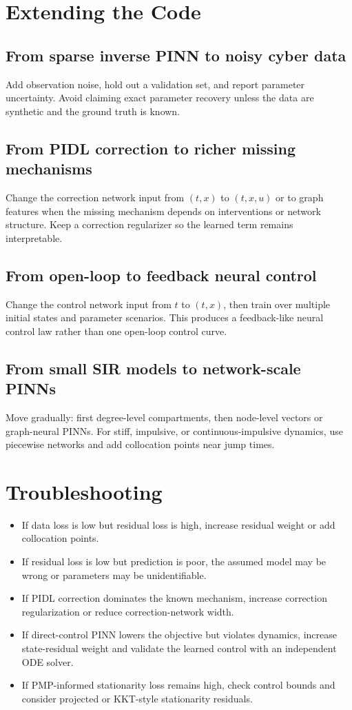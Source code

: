 \documentclass[11pt,a4paper]{article}
\begin{document}
\section{Extending the Code}
\subsection{From sparse inverse PINN to noisy cyber data}
Add observation noise, hold out a validation set, and report parameter uncertainty. Avoid claiming exact parameter recovery unless the data are synthetic and the ground truth is known.

\subsection{From PIDL correction to richer missing mechanisms}
Change the correction network input from \((t,x)\) to \((t,x,u)\) or to graph features when the missing mechanism depends on interventions or network structure. Keep a correction regularizer so the learned term remains interpretable.

\subsection{From open-loop to feedback neural control}
Change the control network input from \(t\) to \((t,x)\), then train over multiple initial states and parameter scenarios. This produces a feedback-like neural control law rather than one open-loop control curve.

\subsection{From small SIR models to network-scale PINNs}
Move gradually: first degree-level compartments, then node-level vectors or graph-neural PINNs. For stiff, impulsive, or continuous-impulsive dynamics, use piecewise networks and add collocation points near jump times.

\section{Troubleshooting}
\begin{itemize}
\item If data loss is low but residual loss is high, increase residual weight or add collocation points.
\item If residual loss is low but prediction is poor, the assumed model may be wrong or parameters may be unidentifiable.
\item If PIDL correction dominates the known mechanism, increase correction regularization or reduce correction-network width.
\item If direct-control PINN lowers the objective but violates dynamics, increase state-residual weight and validate the learned control with an independent ODE solver.
\item If PMP-informed stationarity loss remains high, check control bounds and consider projected or KKT-style stationarity residuals.
\end{itemize}
\end{document}
